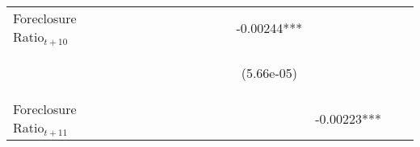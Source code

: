 \begin{table}
\begin{center}
{\begin{tabular}{lccccccccccccc}
Foreclosure Ratio$_{t+10}$  &    &  &  &  &  &  &  &  &  & -0.00244*** &  &  \\
\vspace{4pt}& \begin{footnotesize}\end{footnotesize} & \begin{footnotesize}\end{footnotesize} & \begin{footnotesize}\end{footnotesize} & \begin{footnotesize}\end{footnotesize} & \begin{footnotesize}\end{footnotesize} & \begin{footnotesize}\end{footnotesize} & \begin{footnotesize}\end{footnotesize} & \begin{footnotesize}\end{footnotesize} & \begin{footnotesize}\end{footnotesize} & \begin{footnotesize}(5.66e-05)\end{footnotesize} & \begin{footnotesize}\end{footnotesize} & \begin{footnotesize}\end{footnotesize} \\
Foreclosure Ratio$_{t+11}$  &    &  &  &  &  &  &  &  &  &  & -0.00223*** &  \\

\end{tabular}}
\end{center}
\end{table}
